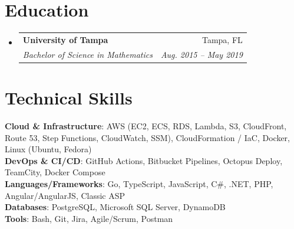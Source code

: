 \documentclass[letterpaper,11pt]{article}
\makeatletter
\newcommand{\resumeSubheading}[4]{
  \vspace{-2pt}\item
    \begin{tabular*}{0.97\textwidth}[t]{l@{\extracolsep{\fill}}r}
      \textbf{#1} & #2 \\
      \textit{\small#3} & \textit{\small #4} \\
    \end{tabular*}\vspace{-7pt}
}
\newcommand{\resumeSubHeadingListStart}{\begin{itemize}[leftmargin=0.15in, label={}]}
\newcommand{\resumeSubHeadingListEnd}{\end{itemize}}
\makeatother
\begin{document}
\section{Education}
  \resumeSubHeadingListStart
    \resumeSubheading
      {University of Tampa}{Tampa, FL}
      {Bachelor of Science in Mathematics}{Aug. 2015 -- May 2019}
  \resumeSubHeadingListEnd
 
\section{Technical Skills}
 \begin{itemize}[leftmargin=0.15in, label={}]
    \small{\item{
     \textbf{Cloud \& Infrastructure}{: AWS (EC2, ECS, RDS, Lambda, S3, CloudFront, Route 53, Step Functions, CloudWatch, SSM), CloudFormation / IaC, Docker, Linux (Ubuntu, Fedora)} \\
     \textbf{DevOps \& CI/CD}{: GitHub Actions, Bitbucket Pipelines, Octopus Deploy, TeamCity, Docker Compose} \\
     \textbf{Languages/Frameworks}{: Go, TypeScript, JavaScript, C\#, .NET, PHP, Angular/AngularJS, Classic ASP} \\
     \textbf{Databases}{: PostgreSQL, Microsoft SQL Server, DynamoDB} \\
     \textbf{Tools}{: Bash, Git, Jira, Agile/Scrum, Postman}
    }}
 \end{itemize}

\end{document}
